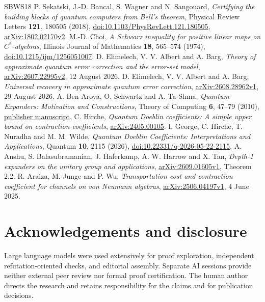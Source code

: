 \documentclass[11pt]{article}
\begin{document}
\begin{thebibliography}{SBWS18}
 P. Sekatski, J.-D. Bancal, S. Wagner and N. Sangouard, \emph{Certifying the building blocks of quantum computers from Bell's theorem}, Physical Review Letters \textbf{121}, 180505 (2018), \href{https://doi.org/10.1103/PhysRevLett.121.180505}{doi:10.1103/PhysRevLett.121.180505}, \href{https://arxiv.org/abs/1802.02170v2}{arXiv:1802.02170v2}.
 M.-D. Choi, \emph{A Schwarz inequality for positive linear maps on \(C^*\)-algebras}, Illinois Journal of Mathematics \textbf{18}, 565--574 (1974), \href{https://doi.org/10.1215/ijm/1256051007}{doi:10.1215/ijm/1256051007}.
 D. Elimelech, V. V. Albert and A. Barg, \emph{Theory of approximate quantum error correction and the error-set model}, \href{https://arxiv.org/abs/2607.22995v2}{arXiv:2607.22995v2}, 12 August 2026.
 D. Elimelech, V. V. Albert and A. Barg, \emph{Universal recovery in approximate quantum error correction}, \href{https://arxiv.org/abs/2608.28962v1}{arXiv:2608.28962v1}, 29 August 2026.
 A. Ben-Aroya, O. Schwartz and A. Ta-Shma, \emph{Quantum Expanders: Motivation and Constructions}, Theory of Computing \textbf{6}, 47--79 (2010), \href{https://theoryofcomputing.org/articles/v006a003/v006a003.pdf}{publisher manuscript}.
 C. Hirche, \emph{Quantum Doeblin coefficients: A simple upper bound on contraction coefficients}, \href{https://arxiv.org/abs/2405.00105}{arXiv:2405.00105}.
 I. George, C. Hirche, T. Nuradha and M. M. Wilde, \emph{Quantum Doeblin Coefficients: Interpretations and Applications}, Quantum \textbf{10}, 2115 (2026), \href{https://doi.org/10.22331/q-2026-05-22-2115}{doi:10.22331/q-2026-05-22-2115}.
 A. Anshu, S. Balasubramanian, J. Haferkamp, A. W. Harrow and X. Tan, \emph{Depth-1 expanders on the unitary group and applications}, \href{https://arxiv.org/abs/2609.01605v1}{arXiv:2609.01605v1}, Theorem 2.2.
 R. Araiza, M. Junge and P. Wu, \emph{Transportation cost and contraction coefficient for channels on von Neumann algebras}, \href{https://arxiv.org/abs/2506.04197v1}{arXiv:2506.04197v1}, 4 June 2025.
\end{thebibliography}
\section*{Acknowledgements and disclosure}

Large language models were used extensively for proof exploration, independent
refutation-oriented checks, and editorial assembly. Separate AI sessions
provide neither external peer review nor formal proof certification. The
human author directs the research and retains responsibility for the claims
and for publication decisions.
\end{document}
